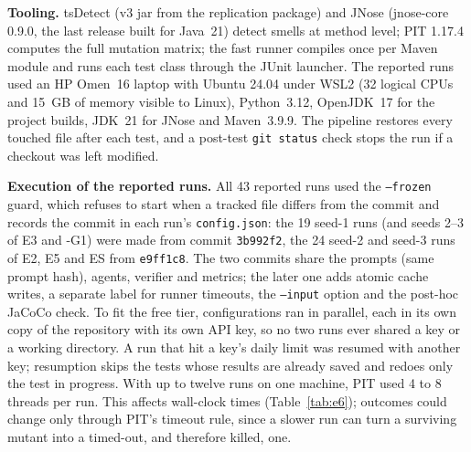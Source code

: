 \textbf{Tooling.} tsDetect (v3 jar from the replication package) and JNose (jnose-core 0.9.0, the last release built for Java~21) detect smells at method level;
PIT 1.17.4 computes the full mutation matrix; the fast runner compiles once per Maven module and runs each test class through the JUnit launcher.
The reported runs used an HP Omen~16 laptop with Ubuntu 24.04 under WSL2 (32 logical CPUs and 15~GB of memory visible to Linux), Python~3.12, OpenJDK~17 for the project builds, JDK~21 for JNose and Maven~3.9.9.
The pipeline restores every touched file after each test, and a post-test \texttt{git status} check stops the run if a checkout was left modified.

\textbf{Execution of the reported runs.} All 43 reported runs used the \texttt{--frozen} guard, which refuses to start when a tracked file differs from the commit and records the commit in each run's \texttt{config.json}: the 19 seed-1 runs (and seeds 2--3 of E3 and \textsf{-G1}) were made from commit \texttt{3b992f2}, the 24 seed-2 and seed-3 runs of E2, E5 and ES from \texttt{e9ff1c8}. The two commits share the prompts (same prompt hash), agents, verifier and metrics; the later one adds atomic cache writes, a separate label for runner timeouts, the \texttt{--input} option and the post-hoc JaCoCo check.
To fit the free tier, configurations ran in parallel, each in its own copy of the repository with its own API key, so no two runs ever shared a key or a working directory. A run that hit a key's daily limit was resumed with another key; resumption skips the tests whose results are already saved and redoes only the test in progress.
With up to twelve runs on one machine, PIT used 4 to 8 threads per run. This affects wall-clock times (Table~\ref{tab:e6}); outcomes could change only through PIT's timeout rule, since a slower run can turn a surviving mutant into a timed-out, and therefore killed, one.

